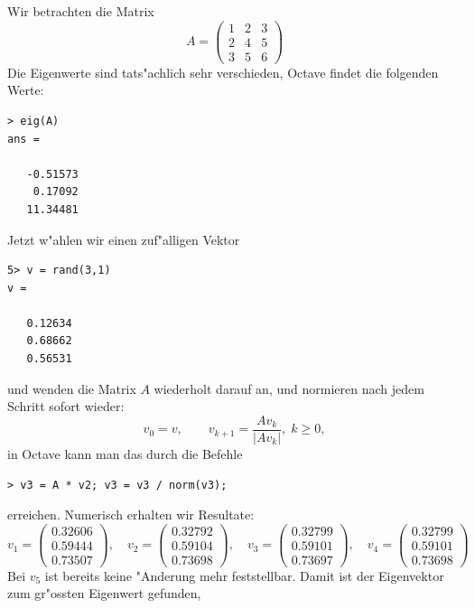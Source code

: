 \begin{beispiel}
Wir betrachten die Matrix 
\[
A=\begin{pmatrix}
1&2&3\\
2&4&5\\
3&5&6
\end{pmatrix}
\]
Die Eigenwerte sind tats"achlich sehr verschieden, Octave findet
die folgenden Werte:
\begin{verbatim}
> eig(A)
ans =

   -0.51573
    0.17092
   11.34481
\end{verbatim}
Jetzt w"ahlen wir einen zuf"alligen Vektor
\begin{verbatim}
5> v = rand(3,1)
v =

   0.12634
   0.68662
   0.56531
\end{verbatim}
und wenden die Matrix $A$ wiederholt darauf an, und normieren nach
jedem Schritt sofort wieder:
\[
v_0 = v,\qquad v_{k+1}=\frac{Av_k}{|Av_k|},\; k\ge 0,
\]
in Octave kann man das durch die Befehle
\begin{verbatim}
> v3 = A * v2; v3 = v3 / norm(v3);
\end{verbatim}
erreichen.
Numerisch erhalten wir Resultate:
\[
v_1=\begin{pmatrix}
   0.32606\\
   0.59444\\
   0.73507
\end{pmatrix}
,\quad
v_2=\begin{pmatrix}
   0.32792\\
   0.59104\\
   0.73698
\end{pmatrix}
,\quad
v_3=\begin{pmatrix}
   0.32799\\
   0.59101\\
   0.73697
\end{pmatrix}
,\quad
v_4=\begin{pmatrix}
   0.32799\\
   0.59101\\
   0.73698
\end{pmatrix}
\]
Bei $v_5$ ist bereits keine "Anderung mehr feststellbar. Damit
ist der Eigenvektor zum gr"ossten Eigenwert gefunden, 
\end{beispiel}

